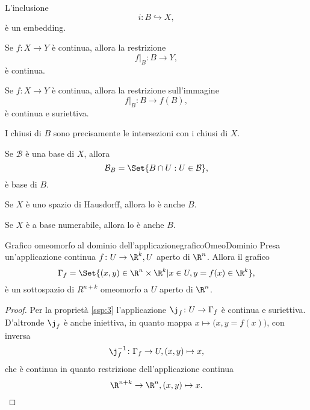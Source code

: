 \begin{pr}\label{ssp:1}
	L'inclusione
	\[
		i\colon B\hookrightarrow X,
	\]
	è un embedding.
\end{pr}

\begin{pr}\label{ssp:2}
	Se \(f\colon X\to Y\) è continua, allora la restrizione
	\[
		f|_B\colon B\to Y,
	\]
	è continua.
\end{pr}

\begin{pr}\label{ssp:3}
	Se \(f\colon X\to Y\) è continua, allora la restrizione sull'immagine
	\[
		f|_B\colon B\to f(B),
	\]
	è continua e suriettiva.
\end{pr}

\begin{pr}\label{ssp:4}
	I chiusi di \(B\) sono precisamente le intersezioni con i chiusi di \(X\).
\end{pr}

\begin{pr}\label{ssp:5}
	Se \(\mathcal{B}\) è una base di \(X\), allora
	\[
		\mathcal{B}_B=\Set{B\cap U:U\in\mathcal{B}},
	\]
	è base di \(B\).
\end{pr}

\begin{pr}\label{ssp:6}
	Se \(X\) è uno spazio di Hausdorff, allora lo è anche \(B\).
\end{pr}

\begin{pr}\label{ssp:7}
	Se \(X\) è a base numerabile, allora lo è anche \(B\).
\end{pr}

\begin{prop}{Grafico omeomorfo al dominio dell'applicazione}{graficoOmeoDominio}
	Presa un'applicazione continua \(f\colon U\to\R^k,U\) aperto di \(\R^n\).
	Allora il grafico
	\[
		\Gamma_f=\Set{(x,y)\in\R^n\times\R^k | x\in U,y=f(x)\in\R^k},
	\]
	è un sottospazio di \(R^{n+k}\) omeomorfo a \(U\) aperto di \(\R^n\).
\end{prop}

\begin{proof}
	Per la proprietà \ref{ssp:3} l'applicazione \(\j_f\colon U\to\Gamma_f\) è continua e suriettiva.
	D'altronde \(\j_f\) è anche iniettiva, in quanto mappa \(x\mapsto \big(x,y=f(x)\big)\), con inversa
	\[
		\j_f^{-1}\colon \Gamma_f\to U,(x,y)\mapsto x,
	\]
	che è continua in quanto restrizione dell'applicazione continua
	\[
		\R^{n+k}\to\R^n,(x,y)\mapsto x.\qedhere
	\]
\end{proof}

